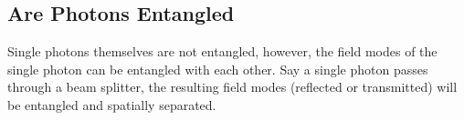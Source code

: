 \subsection{Are Photons Entangled}
Single photons themselves are not entangled, however, the field modes of the single photon can be entangled with each other. Say a single photon passes through a beam splitter, the resulting field modes (reflected or transmitted) will be entangled and spatially separated.